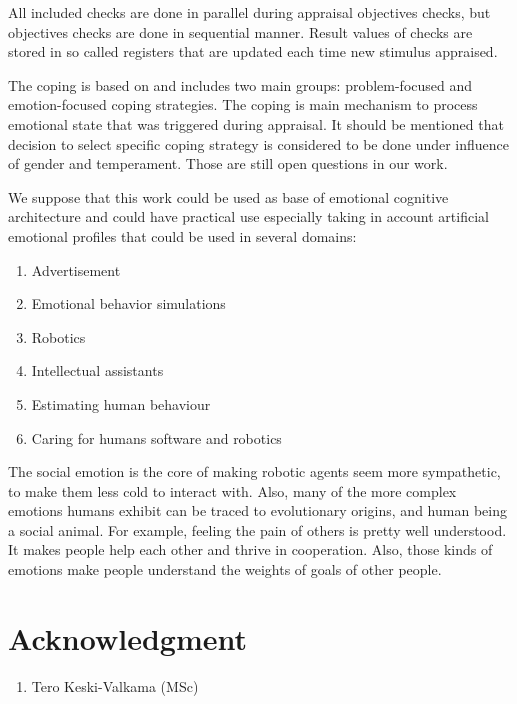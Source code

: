 All included checks are done in parallel during appraisal objectives checks, but objectives checks are done in sequential manner.
Result values of checks are stored in so called registers that are updated each time new stimulus appraised.

The coping is based on \cite{dont_worry_be_happy} and includes two main groups: problem-focused and emotion-focused coping strategies. The coping is main mechanism to process emotional state that was triggered during appraisal. It should be mentioned that decision to select specific coping strategy is considered to be done under influence of gender and temperament. Those are still open questions in our work.

We suppose that this work could be used as base of emotional cognitive architecture and could have practical use especially taking in account artificial emotional profiles that could be used in several domains:

\begin{enumerate}
 \item  Advertisement
 \item  Emotional behavior simulations
 \item  Robotics
 \item  Intellectual assistants
 \item  Estimating human behaviour
 \item  Caring for humans software and robotics
\end{enumerate}

The social emotion is the core of making robotic agents seem more sympathetic, to make them less cold to interact with.
Also, many of the more complex emotions humans exhibit can be traced to evolutionary origins, and human being a social animal.
For example, feeling the pain of others is pretty well understood. It makes people help each other and thrive in cooperation.
Also, those kinds of emotions make people understand the weights of goals of other people.

\section{Acknowledgment}

\begin{enumerate}
 \item Tero Keski-Valkama (MSc)
\end{enumerate}


